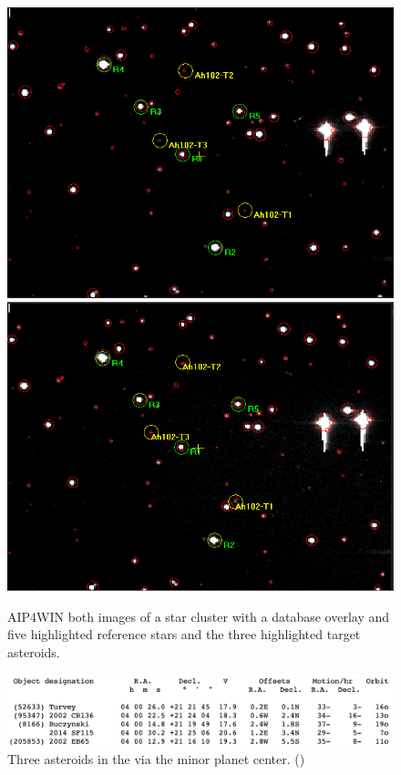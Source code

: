 \documentclass[12pt]{article}
\begin{document}
\begin{figure}[H]
\begin{multicols}{2}
\centering
\includegraphics[scale=0.5]{Images/S2/dcdtarget.PNG}
\includegraphics[scale=0.5]{Images/S2/dadtarget.PNG}
\end{multicols}
\caption{AIP4WIN both images of a star cluster with a database overlay and five highlighted reference stars and the three highlighted target asteroids.}
\label{Target}
\end{figure}

\begin{figure}[H]
\centering
\includegraphics[scale=0.7]{Images/S2/Minor.png}
\caption{Three asteroids in the via the minor planet center. (\cite{Minor})}
\label{Minor planet center}
\end{figure}
\end{document}
